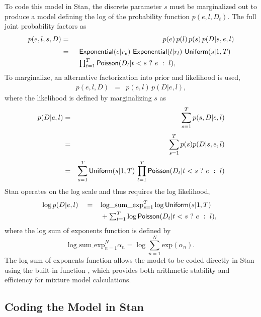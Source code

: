 To code this model in Stan, the discrete parameter $s$ must be
marginalized out to produce a model defining the log of the
probability function $p(e,l,D_t)$.  The full joint probability factors
as 
%
\begin{eqnarray*}
p(e,l,s,D)
& = & p(e) \, p(l) \, p(s) \, p(D | s, e, l)
\\[3pt]
& = & 
\begin{array}[t]{l}
\distro{Exponential}(e|r_e) \ \distro{Exponential}(l|r_l) \ \distro{Uniform}(s|1,T)
\\[3pt]
\prod_{t=1}^T \distro{Poisson}(D_t | t < s \ ? \ e \ : \ l),
\end{array}
\end{eqnarray*}
%
To marginalize, an alternative factorization into prior and likelihood
is used,
%
\begin{eqnarray*}
p(e,l,D) & = & p(e,l) \, p(D|e,l),
\end{eqnarray*}
%
where the likelihood is defined by marginalizing $s$ as
%
\begin{eqnarray*}
p(D | e,l) 
& = &
\sum_{s=1}^T p(s, D | e,l)
\\[3pt]
& = &
\sum_{s=1}^T p(s) p(D | s,e,l)
\\[3pt]
& = &
\sum_{s=1}^T \mbox{\sf Uniform}(s | 1,T) 
\, \prod_{t=1}^T \mbox{\sf Poisson}(D_t | t < s \ ? \ e \ : \ l)
\end{eqnarray*}
%
Stan operates on the log scale and thus requires the log likelihood,
%
\[
\log p(D | e,l)
\\[3pt]
\mbox{ } \ \ = \
\begin{array}[t]{l}
\mbox{log\_sum\_exp}_{s=1}^T \log \mbox{\sf Uniform}(s | 1,T) 
\\[3pt]
{} + \sum_{t=1}^T \log \mbox{\sf Poisson}(D_t | t < s \ ? \ e \ : \ l),
\end{array}
\]
%
where the log sum of exponents function is defined by
\[
\mbox{log\_sum\_exp}_{n=1}^N \alpha_n
=
\log \sum_{n=1}^N \mbox{exp}(\alpha_n).
\]
%
The log sum of exponents function allows the model to be coded
directly in Stan using the built-in function ,
which provides both arithmetic stability and efficiency for mixture
model calculations.


\subsection{Coding the Model in Stan}

